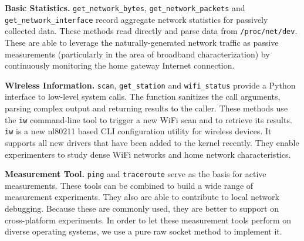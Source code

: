 {\textbf{Basic Statistics.} \texttt{get\_network\_bytes}, \texttt{get\_network\_packets}
and \texttt{get\_network\_interface} record aggregate network statistics for
passively collected data. These methods read directly and parse data
from \texttt{/proc/net/dev}. These are able to leverage the naturally-generated
network traffic as passive measurements (particularly in the area of broadband
 characterization) by continuously monitoring the home gateway Internet connection.

\textbf{Wireless Information.} \texttt{scan}, \texttt{get\_station} and \texttt{wifi\_status}
 provide a Python interface to low-level system calls. The function sanitizes
 the call arguments, parsing complex output and returning results to the caller.
 These methods use the \texttt{iw} command-line tool to trigger a new WiFi scan
  and to retrieve its results. \texttt{iw} is a new nl80211 based CLI configuration
   utility for wireless devices. It supports all new drivers that have been added
    to the kernel recently\cite{iw}. They enable experimenters to study dense WiFi
    networks and home network characteristics.

\textbf{Measurement Tool.} \texttt{ping} and \texttt{traceroute} serve as the basis
 for active measurements. These tools can be combined to build a wide range of
 measurement experiments. They also are able to contribute to local network debugging.
Because these are commonly used, they are better to support on cross-platform experiments.
  In order to let these measurement tools perform on diverse operating systems,
  we use a pure raw socket method to implement it.


}
